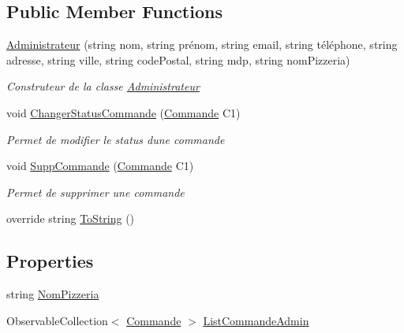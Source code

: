 \subsection*{Public Member Functions}
\begin{DoxyCompactItemize}
\item 
\hyperlink{classModele_1_1Administrateur_a40c3109f24be95eb818d4be43e77371d}{Administrateur} (string nom, string prénom, string email, string téléphone, string adresse, string ville, string code\+Postal, string mdp, string nom\+Pizzeria)
\begin{DoxyCompactList}\small\item\em Construteur de la classe \hyperlink{classModele_1_1Administrateur}{Administrateur} \end{DoxyCompactList}\item 
void \hyperlink{classModele_1_1Administrateur_a8a5f3e9868bb6c19d0b62f572d9d997d}{Changer\+Status\+Commande} (\hyperlink{classModele_1_1Commande}{Commande} C1)
\begin{DoxyCompactList}\small\item\em Permet de modifier le status d\textquotesingle{}une commande \end{DoxyCompactList}\item 
void \hyperlink{classModele_1_1Administrateur_af58fa8152718abdae5eb6e9b1bb01017}{Supp\+Commande} (\hyperlink{classModele_1_1Commande}{Commande} C1)
\begin{DoxyCompactList}\small\item\em Permet de supprimer une commande \end{DoxyCompactList}\item 
override string \hyperlink{classModele_1_1Administrateur_a71e57f381897a6adf83b43cdd1e47cde}{To\+String} ()
\end{DoxyCompactItemize}
\subsection*{Properties}
\begin{DoxyCompactItemize}
\item 
string \hyperlink{classModele_1_1Administrateur_addbed2fd93cf904a6703d8debd758313}{Nom\+Pizzeria}
\item 
Observable\+Collection$<$ \hyperlink{classModele_1_1Commande}{Commande} $>$ \hyperlink{classModele_1_1Administrateur_ad73b7b5b20cd940be7176a42cffda851}{List\+Commande\+Admin}
\end{DoxyCompactItemize}
